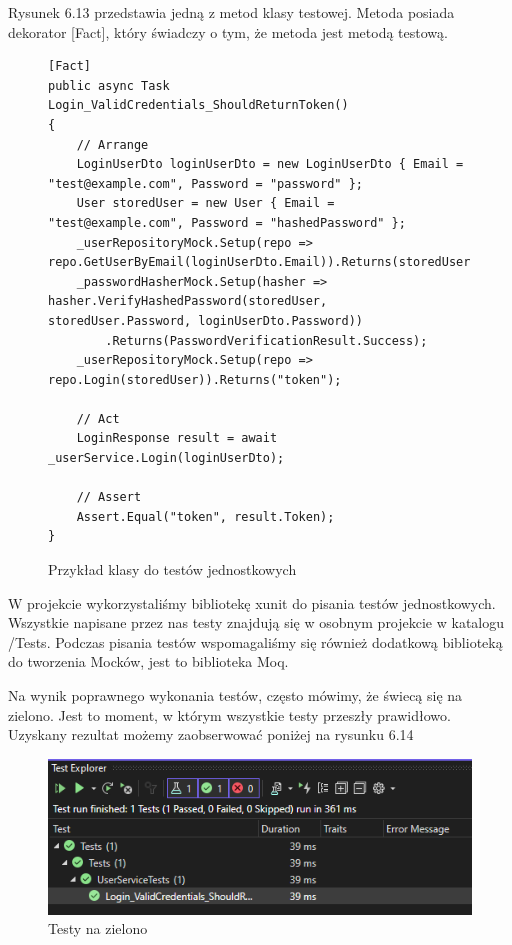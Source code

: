 \documentclass[a4paper,twoside,12pt]{book}
\begin{document}
Rysunek 6.13 przedstawia jedną z metod klasy testowej. Metoda posiada dekorator [Fact], który świadczy o tym, że metoda jest metodą testową.
    \begin{figure}[H]
        \begin{lstlisting}
[Fact]
public async Task Login_ValidCredentials_ShouldReturnToken()
{
    // Arrange
    LoginUserDto loginUserDto = new LoginUserDto { Email = "test@example.com", Password = "password" };
    User storedUser = new User { Email = "test@example.com", Password = "hashedPassword" };
    _userRepositoryMock.Setup(repo => repo.GetUserByEmail(loginUserDto.Email)).Returns(storedUser);
    _passwordHasherMock.Setup(hasher => hasher.VerifyHashedPassword(storedUser, storedUser.Password, loginUserDto.Password))
        .Returns(PasswordVerificationResult.Success);
    _userRepositoryMock.Setup(repo => repo.Login(storedUser)).Returns("token");

    // Act
    LoginResponse result = await _userService.Login(loginUserDto);

    // Assert
    Assert.Equal("token", result.Token);
}
        \end{lstlisting}
    \caption{Przykład klasy do testów jednostkowych}
    \label{fig:pseudokod:listings}
    \end{figure}


W projekcie wykorzystaliśmy bibliotekę xunit do pisania testów jednostkowych. Wszystkie napisane przez nas testy znajdują się w osobnym projekcie w katalogu /Tests. Podczas pisania testów wspomagaliśmy się również dodatkową biblioteką do tworzenia Mocków, jest to biblioteka Moq.

Na wynik poprawnego wykonania testów, często mówimy, że świecą się na zielono. Jest to moment, w którym wszystkie testy przeszły prawidłowo. Uzyskany rezultat możemy zaobserwować poniżej na rysunku 6.14
\begin{figure}[H]
    \centering
    \includegraphics[width=1\textwidth]{poprawneTesty.png}
    \caption{Testy na zielono}
    \label{SuccessTests}
\end{figure}
\end{document}
